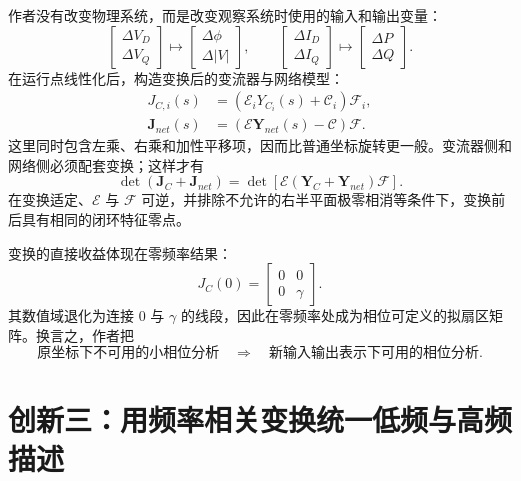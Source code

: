 \documentclass[11pt,a4paper]{ctexart}
\begin{document}
作者没有改变物理系统，而是改变观察系统时使用的输入和输出变量：
\begin{equation}
\begin{bmatrix}\Delta V_D\\\Delta V_Q\end{bmatrix}
\longmapsto
\begin{bmatrix}\Delta\phi\\\Delta|V|\end{bmatrix},
\qquad
\begin{bmatrix}\Delta I_D\\\Delta I_Q\end{bmatrix}
\longmapsto
\begin{bmatrix}\Delta P\\\Delta Q\end{bmatrix}.
\end{equation}
在运行点线性化后，构造变换后的变流器与网络模型：
\begin{align}
J_{C,i}(s)&=(\mathcal E_iY_{C_i}(s)+\mathcal C_i)\mathcal F_i,\\
\mathbf J_{net}(s)&=(\boldsymbol{\mathcal E}\mathbf Y_{net}(s)-\boldsymbol{\mathcal C})\boldsymbol{\mathcal F}.
\end{align}
这里同时包含左乘、右乘和加性平移项，因而比普通坐标旋转更一般。变流器侧和网络侧必须配套变换；这样才有
\begin{equation}
\det(\mathbf J_C+\mathbf J_{net})
=\det\!\left[\boldsymbol{\mathcal E}
(\mathbf Y_C+\mathbf Y_{net})\boldsymbol{\mathcal F}\right].
\end{equation}
在变换适定、$\boldsymbol{\mathcal E}$ 与 $\boldsymbol{\mathcal F}$ 可逆，并排除不允许的右半平面极零相消等条件下，变换前后具有相同的闭环特征零点。

变换的直接收益体现在零频率结果：
\begin{equation}
J_C(0)=\begin{bmatrix}0&0\\0&\gamma\end{bmatrix}.
\end{equation}
其数值域退化为连接 $0$ 与 $\gamma$ 的线段，因此在零频率处成为相位可定义的拟扇区矩阵。换言之，作者把
\[
\text{原坐标下不可用的小相位分析}
\quad\Longrightarrow\quad
\text{新输入输出表示下可用的相位分析}.
\]

\section{创新三：用频率相关变换统一低频与高频描述}
\end{document}
